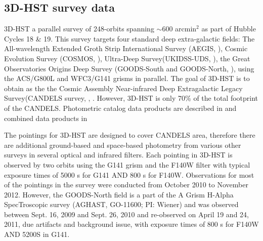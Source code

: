 \documentclass[manuscript]{aastex63}
\begin{document}
\subsection{3D-HST survey data}
 3D-HST a parallel survey of 248-orbits spanning $\sim$600 arcmin$^2$ as part of Hubble Cycles 18 \& 19. This survey targets four standard deep extra-galactic fields: The All-wavelength Extended Groth Strip International Survey (AEGIS, \citealt{1538-4357-660-1-L1} ), Cosmic Evolution Survey (COSMOS, \citealt{Scoville2007}), Ultra-Deep Survey(UKIDSS-UDS, \citealt{2007MNRAS.379.1599L}), the Great Observatories Origins Deep Survey (GOODS-South and GOODS-North, \citealt{Giavalisco2004}), using the ACS/G800L and WFC3/G141 grisms in parallel. The goal of 3D-HST is to obtain as the the Cosmic Assembly Near-infrared Deep Extragalactic Legacy Survey(CANDELS survey, \citealt{2011ApJS..197...35G}, \citealt{2011ApJS..197...36K}. However, 3D-HST is only 70\% of the total footprint of the CANDELS. Photometric catalog data products are described in \cite{Skelton2014} and combined data products in \cite{Momcheva2016}

 The pointings for 3D-HST are designed to cover CANDELS area, therefore there are additional ground-based and space-based photometry from various other surveys in several optical and infrared filters. Each pointing in 3D-HST is observed by two orbits using the G141 grism and the F140W filter with typical exposure times of 5000 s for G141 AND 800 s for F140W. Observations for most of the pointings in the survey were conducted from October 2010 to November 2012. However, the GOODS-North field is a part of the A Grism H-Alpha SpecTroscopic survey (AGHAST, GO-11600; PI: Wiener) and was observed between Sept. 16, 2009 and Sept. 26, 2010 and re-observed on April 19 and 24, 2011, due artifacts and background issue, with exposure times of 800 s for F140W AND 5200S in G141.  
\end{document}
